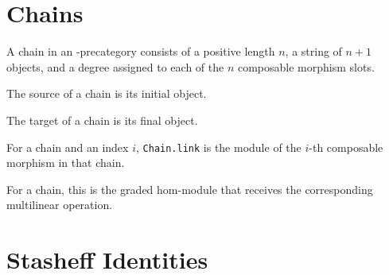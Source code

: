 \section{Chains}

\begin{definition}[Chain]
\label{AInfinityCategoryTheory.AInfinityPreCategory.Chain}
{}
A chain in an \Ainf{}-precategory consists of a positive length $n$, a string of
$n+1$ objects, and a degree assigned to each of the $n$ composable morphism
slots.
\end{definition}

\begin{definition}[Chain source]
\label{AInfinityCategoryTheory.AInfinityPreCategory.Chain.source}
{}
The source of a chain is its initial object.
\end{definition}

\begin{definition}[Chain target]
\label{AInfinityCategoryTheory.AInfinityPreCategory.Chain.target}
{}
The target of a chain is its final object.
\end{definition}

\begin{definition}
\label{AInfinityCategoryTheory.AInfinityPreCategory.Chain.link}
{}
For a chain and an index $i$,
\texttt{Chain.link} is the module of
the $i$-th composable morphism in that chain.
\end{definition}

\begin{definition}
\label{AInfinityCategoryTheory.AInfinityPreCategory.Chain.operationTarget}
{}
For a chain, this is the graded hom-module that receives the corresponding
multilinear operation.
\end{definition}

\section{Stasheff Identities}

